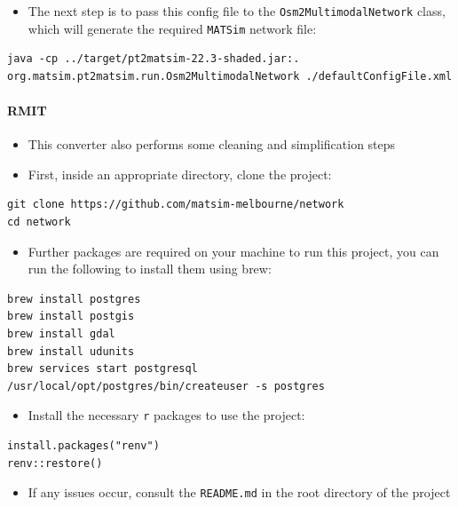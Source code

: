 \documentclass[11pt]{article}
\begin{document}
\begin{itemize}
\item The next step is to pass this config file to the \texttt{Osm2MultimodalNetwork} class, which will generate the required \texttt{MATSim} network file:
\end{itemize}
\begin{verbatim}
java -cp ../target/pt2matsim-22.3-shaded.jar:. org.matsim.pt2matsim.run.Osm2MultimodalNetwork ./defaultConfigFile.xml
\end{verbatim}
\paragraph{RMIT}
\label{sec:org68f57d5}
\begin{itemize}
\item This converter also performs some cleaning and simplification steps
\item First, inside an appropriate directory, clone the project:
\end{itemize}
\begin{verbatim}
git clone https://github.com/matsim-melbourne/network
cd network
\end{verbatim}

\begin{itemize}
\item Further packages are required on your machine to run this project, you can run the following to install them using brew:
\end{itemize}
\begin{verbatim}
brew install postgres
brew install postgis
brew install gdal
brew install udunits
brew services start postgresql
/usr/local/opt/postgres/bin/createuser -s postgres
\end{verbatim}

\begin{itemize}
\item Install the necessary \texttt{r} packages to use the project:
\end{itemize}
\begin{verbatim}
install.packages("renv")
renv::restore()
\end{verbatim}

\begin{itemize}
\item If any issues occur, consult the \texttt{README.md} in the root directory of the project
\end{itemize}
\end{document}
